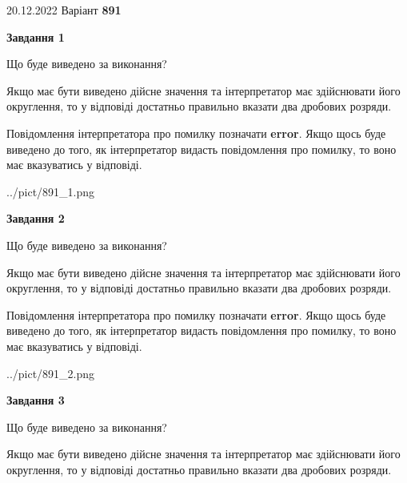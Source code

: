 \documentclass[12pt, ukrainian]{article}
\begin{document}
{20.12.2022 Варіант \No \textbf { 891 }\par}
{
\begin {Large}

{\begin {center}\textbf{Завдання 1}\end {center}}\par
Що буде виведено за виконання? \par

Якщо має бути виведено дійсне значення та інтерпретатор має здійснювати його округлення, 
то у відповіді достатньо правильно вказати два дробових розряди.

Повідомлення інтерпретатора про помилку позначати \textbf{error}.
Якщо щось буде виведено до того, як інтерпретатор видасть повідомлення про помилку, 
то воно має вказуватись у відповіді. \par

\begin{center}
	{../pict/891_1.png}
\end{center}
\newpage

{\begin {center}\textbf{Завдання 2}\end {center}}\par
Що буде виведено за виконання? \par

Якщо має бути виведено дійсне значення та інтерпретатор має здійснювати його округлення, 
то у відповіді достатньо правильно вказати два дробових розряди.

Повідомлення інтерпретатора про помилку позначати \textbf{error}.
Якщо щось буде виведено до того, як інтерпретатор видасть повідомлення про помилку, 
то воно має вказуватись у відповіді. \par

\begin{center}
	{../pict/891_2.png}
\end{center}
\newpage

{\begin {center}\textbf{Завдання 3}\end {center}}\par
Що буде виведено за виконання? \par

Якщо має бути виведено дійсне значення та інтерпретатор має здійснювати його округлення, 
то у відповіді достатньо правильно вказати два дробових розряди.


\end{Large}}
\end{document}
